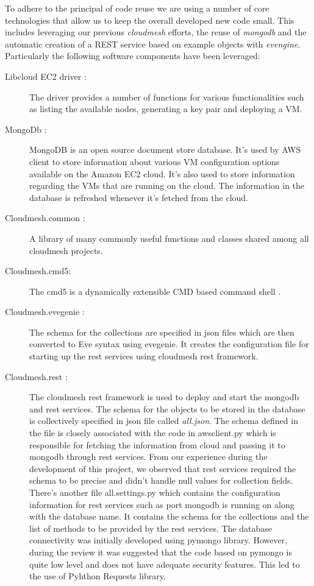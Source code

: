 \documentclass[9pt,twocolumn,twoside]{../../styles/osajnl}
\begin{document}
To adhere to the principal of code reuse we are using a number of core
technologies that allow us to keep the overall developed new code
small. This includes leveraging our previous {\it cloudmesh} efforts, the
reuse of {\it mongodb} and the automatic creation of a REST service based
on example objects with {\it evengine}. Particularly the following
software components have been leveraged:

\begin{description}

\item [Libcloud EC2 driver \cite{??}:] The driver provides a number of functions
  for various functionalities such as listing the available nodes,
  generating a key pair and deploying a VM.

\item [MongoDb  \cite{??}:] MongoDB is an open source document store database. It's
  used by AWS client to store information about various VM
  configuration options available on the Amazon EC2 cloud. It's also
  used to store information regarding the VMs that are running on the
  cloud. The information in the database is refreshed whenever it's
  fetched from the cloud.

\item [Cloudmesh.common \cite{www-cloudmesh-common}:] A library of
  many commonly useful functions and classes shared among all
  cloudmesh projects.

\item [Cloudmesh.cmd5:] The cmd5 is a dynamically extensible CMD based
  command shell \cite{www-cloudmesh-cmd5}.

\item [Cloudmesh.evegenie \cite{www-cloudmesh-evengine}:] The schema for the collections are specified
  in json files which are then converted to Eve syntax using
  evegenie. It creates the configuration file for starting up the rest
  services using cloudmesh rest framework.
	 	
\item [Cloudmesh.rest \cite{www-cloudmesh-rest}:] The cloudmesh rest
  framework is used to deploy and start the mongodb and rest
  services. The schema for the objects to be stored in the database is
  collectively specified in json file called {\it all.json}. The
  schema defined in the file is closely associated with the code in
  awsclient.py which is responsible for fetching the information from
  cloud and passing it to mongodb through rest services. From our
  experience during the development of this project, we observed that
  rest services required the schema to be precise and didn't handle
  null values for collection fields. There's another file
  all.settings.py which contains the configuration information for
  rest services such as port mongodb is running on along with the
  database name. It contains the schema for the collections and the
  list of methods to be provided by the rest services. The database
  connectivity was initially developed using pymongo library. However,
  during the review it was suggested that the code based on pymongo is
  quite low level and does not have adequate security features. This
  led to the use of Pyhthon Requests library.
	

\end{description}
\end{document}
